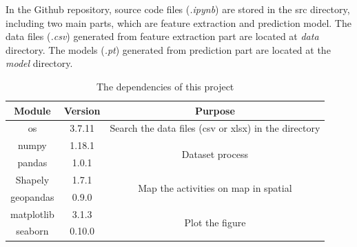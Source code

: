 \documentclass[final-report]{report-template}
\begin{document}
In the Github repository, source code files (\textit{.ipynb}) are stored in the src directory, including two main parts, which are feature extraction and prediction model.
The data files (\textit{.csv}) generated from feature extraction part are located at \textit{data} directory. The models (\textit{.pt}) generated from prediction part are located at the \textit{model} directory.

\begin{table}[]
    \centering
    \caption{The dependencies of this project}
    \label{tab:library_dependency}
    \begin{tabular}{|c|c|c|}
    \hline
    \textbf{Module} & \textbf{Version} & \textbf{Purpose}                                                                                                                                            \\ \hline
    os              & 3.7.11           & Search the data files (csv or xlsx) in the directory                                                                                                        \\ \hline
    numpy           & 1.18.1           & \multirow{2}{*}{Dataset process}                                                                                                                            \\ \cline{1-2}
    pandas          & 1.0.1            &                                                                                                                                                             \\ \hline
    Shapely         & 1.7.1            & \multirow{2}{*}{Map the activities on map in spatial}                                                                                                       \\ \cline{1-2}
    geopandas       & 0.9.0            &                                                                                                                                                             \\ \hline
    matplotlib      & 3.1.3            & \multirow{2}{*}{Plot the figure}                                                                                                                            \\ \cline{1-2}
    seaborn         & 0.10.0           &                                                                                                                                                             \\ \hline

\end{tabular}
\end{table}
\end{document}
